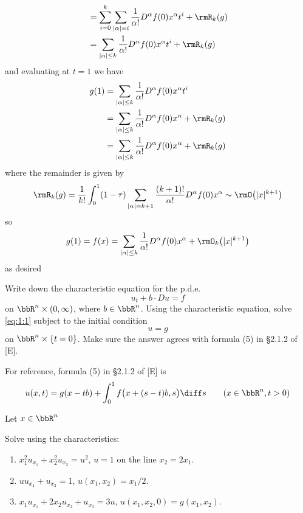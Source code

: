 \begin{solution}
\begin{align*}
    &=\sum_{i=0}^k\sum_{|\alpha|=i}\frac{1}{\alpha!}D^\alpha f(0)x^\alpha t^i+\rmR_k(g)\\
    &=\sum_{|\alpha|\leq k}\frac{1}{\alpha!}D^\alpha f(0)x^\alpha t^i+\rmR_k(g)
  \end{align*}
  and evaluating at \(t=1\) we have
  \begin{align*}
    g(1)
    &=\sum_{|\alpha|\leq k}\frac{1}{\alpha!}D^\alpha f(0)x^\alpha t^i\\
    &=\sum_{|\alpha|\leq k}\frac{1}{\alpha!}D^\alpha
      f(0)x^\alpha+\rmR_k(g)\\
    &=\sum_{|\alpha|\leq k}\frac{1}{\alpha!}D^\alpha
      f(0)x^\alpha+\rmR_k(g)
  \end{align*}
  where the remainder is given by
  \[
    \rmR_k(g)=\frac{1}{k!}\int_0^1(1-\tau)
    \sum_{|\alpha|=k+1}\frac{(k+1)!}{\alpha!}D^\alpha f(0)x^\alpha\sim
    \rmO\bigl(|x|^{k+1}\bigr)
  \]
  so
  \[
    g(1)=f(x)=\sum_{|\alpha|\leq k}\frac{1}{\alpha!}D^\alpha
    f(0)x^\alpha+\rmO_k\bigl(|x|^{k+1}\bigr)
  \]
  as desired
\end{solution}
\newpage

\begin{problem}
  Write down the characteristic equation for the p.d.e.\@
  \[
    \label{eq:1:1}
    \tag{\(*\)}
    u_t+b\cdot Du=f
  \]
  on \(\bbR^n\times(0,\infty)\), where \(b\in\bbR^n\). Using the
  characteristic equation, solve \eqref{eq:1:1} subject to the initial
  condition
  \[
    u=g
  \]
  on \(\bbR^n\times\{t=0\}\). Make sure the answer agrees with formula (5)
  in \S 2.1.2 of [E].
\end{problem}
\begin{solution}
  For reference, formula (5) in \S 2.1.2 of [E] is
  \[
    u(x,t)=g(x -tb)+\int_0^1 f\bigl(x+(s-t)b,s\bigr)\diff s
    \qquad (x\in\bbR^n,t>0)
  \]

  Let \(x\in\bbR^n\)
\end{solution}
\newpage

\begin{problem}
  Solve using the characteristics:
  \begin{enumerate}[label=(\alph*)]
  \item \(x_1^2u_{x_1}+x_2^2u_{x_2}=u^2\), \(u=1\) on the line
    \(x_2=2x_1\).
  \item \(uu_{x_1}+u_{x_2}=1\), \(u(x_1,x_2)=x_1/2\).
  \item \(x_1u_{x_1}+2x_2u_{x_2}+u_{x_3}=3u\),
    \(u(x_1,x_2,0)=g(x_1,x_2)\).
  \end{enumerate}
\end{problem}
\begin{solution}

\end{solution}
\newpage

